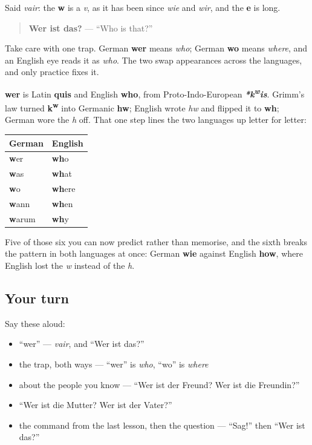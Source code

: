 Said \emph{vair}: the \textbf{w} is a \emph{v}, as it has been since \emph{wie} and \emph{wir}, and the \textbf{e} is long.

\begin{quote}
\textbf{Wer ist das?} — \textquotedblleft{}Who is that?\textquotedblright{}
\end{quote}

Take care with one trap. German \textbf{wer} means \emph{who}; German \textbf{wo} means \emph{where}, and an English eye reads it as \emph{who}. The two swap appearances across the languages, and only practice fixes it.

\begin{cousinweb}
\textbf{wer} is Latin \textbf{quis} and English \textbf{who}, from Proto-Indo-European \emph{\textbf{*k\textsuperscript{w}is}}. Grimm's law turned \textbf{k\textsuperscript{w}} into Germanic \textbf{hw}; English wrote \emph{hw} and flipped it to \textbf{wh}; German wore the \emph{h} off. That one step lines the two languages up letter for letter:

\noindent
\begin{tabularx}{\linewidth}{@{}>{\raggedright\arraybackslash}X>{\raggedright\arraybackslash}X@{}}
\toprule
\textbf{German} & \textbf{English} \\
\midrule
\textbf{w}er & \textbf{wh}o \\
\textbf{w}as & \textbf{wh}at \\
\textbf{w}o & \textbf{wh}ere \\
\textbf{w}ann & \textbf{wh}en \\
\textbf{w}arum & \textbf{wh}y \\
\bottomrule
\end{tabularx}

Five of those six you can now predict rather than memorise, and the sixth breaks the pattern in both languages at once: German \textbf{wie} against English \textbf{how}, where English lost the \emph{w} instead of the \emph{h}.
\end{cousinweb}

\subsection*{Your turn}
Say these aloud:

\begin{itemize}
\raggedright
  \item \textquotedblleft{}wer\textquotedblright{} — \emph{vair}, and \textquotedblleft{}Wer ist das?\textquotedblright{}
  \item the trap, both ways — \textquotedblleft{}wer\textquotedblright{} is \emph{who}, \textquotedblleft{}wo\textquotedblright{} is \emph{where}
  \item about the people you know — \textquotedblleft{}Wer ist der Freund? Wer ist die Freundin?\textquotedblright{}
  \item \textquotedblleft{}Wer ist die Mutter? Wer ist der Vater?\textquotedblright{}
  \item the command from the last lesson, then the question — \textquotedblleft{}Sag!\textquotedblright{} then \textquotedblleft{}Wer ist das?\textquotedblright{}
\end{itemize}

